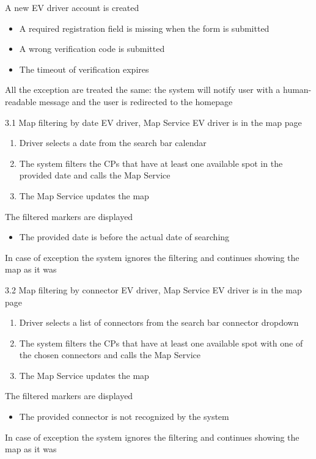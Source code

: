 {A new EV driver account is created}
{
    \begin{itemize}
        \item A required registration field is missing when the form is submitted
        \item A wrong verification code is submitted
        \item The timeout of verification expires
    \end{itemize}
}
{
    All the exception are treated the same: the system will notify user with a human-readable message and the user is redirected to the homepage
}


\usecase
{

}
{3.1}
{Map filtering by date}
{EV driver, Map Service}
{EV driver is in the map page}
{
    \begin{enumerate}
        \item Driver selects a date from the search bar calendar
        \item The system filters the CPs that have at least one available spot in the provided date and calls the Map Service
        \item The Map Service updates the map
    \end{enumerate}
}
{The filtered markers are displayed}
{
    \begin{itemize}
        \item The provided date is before the actual date of searching
    \end{itemize}
}
{
    In case of exception the system ignores the filtering and continues showing the map as it was
}

\usecase
{
}
{3.2}
{Map filtering by connector}
{EV driver, Map Service}
{EV driver is in the map page}
{
    \begin{enumerate}
        \item Driver selects a list of connectors from the search bar connector dropdown
        \item The system filters the CPs that have at least one available spot with one of the chosen connectors and calls the Map Service
        \item The Map Service updates the map
    \end{enumerate}
}
{The filtered markers are displayed}
{
    \begin{itemize}
        \item The provided connector is not recognized by the system
    \end{itemize}
}
{
    In case of exception the system ignores the filtering and continues showing the map as it was
}

